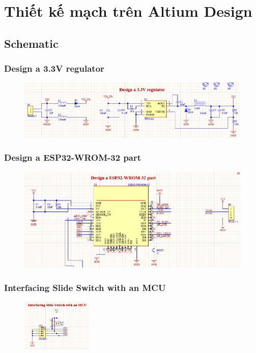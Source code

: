 \section{Thiết kế mạch trên Altium Design}

\subsection{Schematic}

\subsubsection{Design a 3.3V regulator}
\begin{figure}[!htbp]
    \centering
    \includegraphics[width=\textwidth]{graphics/section3/f1.PNG}
\end{figure}

\subsubsection{Design a ESP32-WROM-32 part}
\begin{figure}[!htbp]
    \centering
    \includegraphics[width=\textwidth]{graphics/section3/f2.PNG}
\end{figure}

\subsubsection{Interfacing Slide Switch with an MCU}
\label{subsec: Interfacing Slide Switch with an MCU}
\begin{figure}[!htbp]
    \centering
    \includegraphics[width=0.3\textwidth]{graphics/section3/f3.PNG}
\end{figure}
\FloatBarrier

